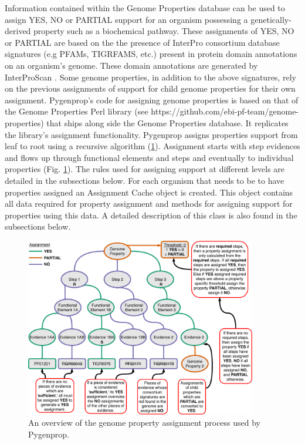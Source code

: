 Information contained within the Genome Properties database can be used to assign YES, NO or PARTIAL support for an organism possessing a genetically-derived property such as a biochemical pathway. These assignments of YES, NO or PARTIAL are based on the the presence of InterPro consortium database signatures (e.g PFAMs, TIGRFAMS, etc.) present in protein domain annotations on an organism's genome. These domain annotations are generated by InterProScan \cite{jones2014interproscan}. Some genome properties, in addition to the above signatures, rely on the previous assignments of support for child genome properties for their own assignment. Pygenprop's code for assigning genome properties is based on that of the Genome Properties Perl library (see https://github.com/ebi-pf-team/genome-properties) that ships along side the Genome Properties database. It replicates the library's assignment functionality. Pygenprop assigns properties support from leaf to root using a recursive algorithm (\ref{fig:propertyassignment}). Assignment starts with step evidences and flows up through functional elements and steps and eventually to individual properties (Fig. \ref{fig:propertyassignment}). The rules used for assigning support at different levels are detailed in the subsections below. For each organism that needs to be to have properties assigned an Assignment Cache object is created. This object contains all data required for property assignment and methods for assigning support for properties using this data. A detailed description of this class is also found in the subsections below.

\begin{figure}[!ht]
     \centering
	\includegraphics[width=0.90\textwidth]{media/Pygenprop_Assignment.pdf}
	 \caption{An overview of the genome property assignment process used by Pygenprop.}
	  \label{fig:propertyassignment}

\end{figure}

